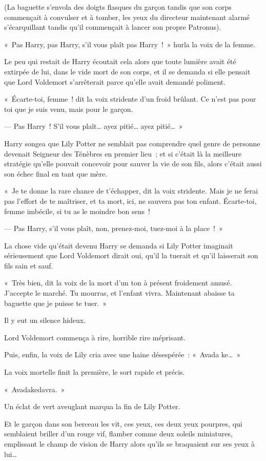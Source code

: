 (La baguette s'envola des doigts flasques du garçon tandis que son corps commençait à convulser et à tomber, les yeux du directeur maintenant alarmé s'écarquillant tandis qu'il commençait à lancer son propre Patronus).
\begin{em}

«~Pas Harry, pas Harry, s'il vous plaît pas Harry~!~»
hurla la voix de la femme.

Le peu qui restait de Harry écoutait cela alors que toute lumière avait été extirpée de lui, dans le vide mort de son corps, et il se demanda si elle pensait que Lord Voldemort s'arrêterait parce qu'elle avait demandé poliment.

«~Écarte-toi, femme~! dit la voix stridente d'un froid brûlant.
Ce n'est pas pour toi que je suis venu, mais pour le garçon.

--- Pas Harry~!
S'il vous plaît… ayez pitié… ayez pitié…~»

Harry songea que Lily Potter ne semblait pas comprendre quel genre de personne devenait Seigneur des Ténèbres en premier lieu~; et si c'était là la meilleure stratégie qu'elle pouvait concevoir pour sauver la vie de son fils, alors c'était aussi son échec final en tant que mère.

«~Je te donne la rare chance de t'échapper, dit la voix stridente.
Mais je ne ferai pas l'effort de te maîtriser, et ta mort, ici, ne sauvera pas ton enfant.
Écarte-toi, femme imbécile, si tu as le moindre bon sens~!

--- Pas Harry, s'il vous plaît, non, prenez-moi, tuez-moi à la place~!~»

La chose vide qu'était devenu Harry se demanda si Lily Potter imaginait sérieusement que Lord Voldemort dirait oui, qu'il la tuerait et qu'il laisserait son fils sain et sauf.

«~Très bien, dit la voix de la mort d'un ton à présent froidement amusé.
J'accepte le marché.
Tu mourras, et l'enfant vivra.
Maintenant abaisse ta baguette que je puisse te tuer.~»

Il y eut un silence hideux.

Lord Voldemort commença à rire, horrible rire méprisant.

Puis, enfin, la voix de Lily cria avec une haine désespérée~: «~Avada ke…~»

La voix mortelle finit la première, le sort rapide et précis.

«~Avadakedavra.~»

Un éclat de vert aveuglant marqua la fin de Lily Potter.

Et le garçon dans son berceau les vit, ces yeux, ces deux yeux pourpres, qui semblaient briller d'un rouge vif, flamber comme deux soleils miniatures, emplissant le champ de vision de Harry alors qu'ils se braquaient sur ses yeux à lui…

\end{em}

